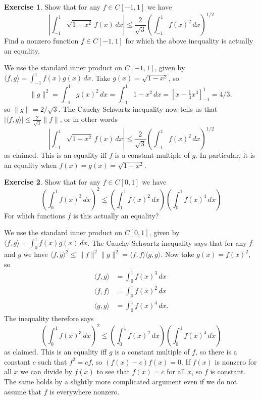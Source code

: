 \documentclass{amsart}
\newcommand{\ip}[1]     {\langle #1\rangle}
\renewcommand{\:}       {\colon}
\theoremstyle{definition}
\newtheorem{exercise}{Exercise}[section]
\renewenvironment{solution}{\SolutionAtEnd}{\endSolutionAtEnd}
\begin{document}
\begin{exercise}
 Show that for any $f\in C[-1,1]$ we have 
 \[ \left|\int_{-1}^1\sqrt{1-x^2}\,f(x)\,dx\right| \leq
     \frac{2}{\sqrt{3}} \left(\int_{-1}^1 f(x)^2\,dx\right)^{1/2} 
 \]
 Find a nonzero function $f\in C[-1,1]$ for which the above inequality
 is actually an equality.
\end{exercise}
\begin{solution}
 We use the standard inner product on $C[-1,1]$, given by
 $\ip{f,g}=\int_{-1}^1f(x)g(x)\,dx$.  Take
 $g(x)=\sqrt{1-x^2}$, so 
 \[ \|g\|^2=\int_{-1}^1g(x)^2\,dx=
     \int_{-1}^1 1-x^2\,dx =
     \left[x-\tfrac{1}{3}x^3\right]_{-1}^1 = 4/3,
 \]
 so $\|g\|=2/\sqrt{3}$.  The Cauchy-Schwartz inequality now
 tells us that $|\ip{f,g}|\leq\frac{2}{\sqrt{3}}\|f\|$, or
 in other words 
 \[ \left|\int_{-1}^1\sqrt{1-x^2}\,f(x)\,dx\right| \leq
     \frac{2}{\sqrt{3}} \left(\int_{-1}^1 f(x)^2\,dx\right)^{1/2} 
 \]
 as claimed.  This is an equality iff $f$ is a constant multiple of
 $g$.  In particular, it is an equality when
 $f(x)=g(x)=\sqrt{1-x^2}$. 
\end{solution}

\begin{exercise}
 Show that for any $f\in C[0,1]$ we have 
 \[ \left(\int_0^1 f(x)^3\,dx\right)^2 \leq 
     \left(\int_0^1 f(x)^2\,dx\right) 
     \left(\int_0^1 f(x)^4\,dx\right)
 \]
 For which functions $f$ is this actually an equality?
\end{exercise}
\begin{solution}
 We use the standard inner product on $C[0,1]$, given by
 $\ip{f,g}=\int_0^1f(x)g(x)\,dx$.  The Cauchy-Schwartz
 inequality says that for any $f$ and $g$ we have
 $\ip{f,g}^2\leq\|f\|^2\|g\|^2=\ip{f,f}\ip{g,g}$.  Now take
 $g(x)=f(x)^2$, so
 \begin{align*}
  \ip{f,g} &= \int_0^1 f(x)^3\,dx \\
  \ip{f,f} &= \int_0^1 f(x)^2\,dx \\
  \ip{g,g} &= \int_0^1 f(x)^4\,dx.
 \end{align*}
 The inequality therefore says
 \[\left(\int_0^1 f(x)^3\,dx\right)^2 \leq 
     \left(\int_0^1 f(x)^2\,dx\right) 
     \left(\int_0^1 f(x)^4\,dx\right)
 \] 
 as claimed.  This is an equality iff $g$ is a constant multiple of
 $f$, so there is a constant $c$ such that $f^2=cf$, so 
 $(f(x)-c)f(x)=0$.  If $f(x)$ is nonzero for all $x$ we can divide by
 $f(x)$ to see that $f(x)=c$ for all $x$, so $f$ is constant.  The
 same holds by a slightly more complicated argument even if we do not
 assume that $f$ is everywhere nonzero.
\end{solution}
\end{document}
